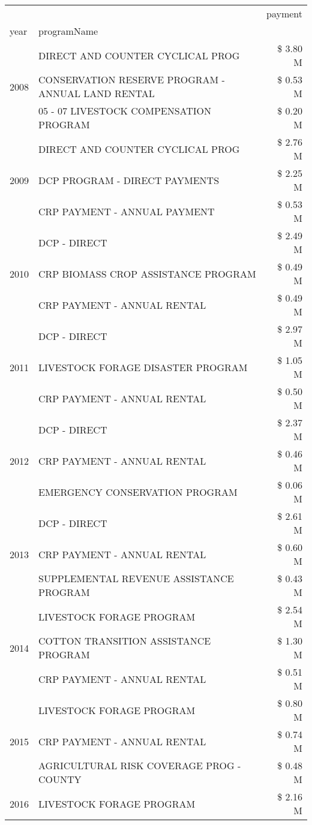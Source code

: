 \begin{tabular}{llr}
\toprule
 &  & payment \\
year & programName &  \\
\midrule
\multirow[t]{3}{*}{2008} & DIRECT AND COUNTER CYCLICAL PROG & \$ 3.80 M \\
 & CONSERVATION RESERVE PROGRAM - ANNUAL LAND RENTAL & \$ 0.53 M \\
 & 05 - 07 LIVESTOCK COMPENSATION PROGRAM & \$ 0.20 M \\
\cline{1-3}
\multirow[t]{3}{*}{2009} & DIRECT AND COUNTER CYCLICAL PROG & \$ 2.76 M \\
 & DCP PROGRAM - DIRECT PAYMENTS & \$ 2.25 M \\
 & CRP PAYMENT - ANNUAL PAYMENT & \$ 0.53 M \\
\cline{1-3}
\multirow[t]{3}{*}{2010} & DCP - DIRECT & \$ 2.49 M \\
 & CRP BIOMASS CROP ASSISTANCE PROGRAM & \$ 0.49 M \\
 & CRP PAYMENT - ANNUAL RENTAL & \$ 0.49 M \\
\cline{1-3}
\multirow[t]{3}{*}{2011} & DCP - DIRECT & \$ 2.97 M \\
 & LIVESTOCK FORAGE DISASTER PROGRAM & \$ 1.05 M \\
 & CRP PAYMENT - ANNUAL RENTAL & \$ 0.50 M \\
\cline{1-3}
\multirow[t]{3}{*}{2012} & DCP - DIRECT & \$ 2.37 M \\
 & CRP PAYMENT - ANNUAL RENTAL & \$ 0.46 M \\
 & EMERGENCY CONSERVATION PROGRAM & \$ 0.06 M \\
\cline{1-3}
\multirow[t]{3}{*}{2013} & DCP - DIRECT & \$ 2.61 M \\
 & CRP PAYMENT - ANNUAL RENTAL & \$ 0.60 M \\
 & SUPPLEMENTAL REVENUE ASSISTANCE PROGRAM & \$ 0.43 M \\
\cline{1-3}
\multirow[t]{3}{*}{2014} & LIVESTOCK FORAGE PROGRAM & \$ 2.54 M \\
 & COTTON TRANSITION ASSISTANCE PROGRAM & \$ 1.30 M \\
 & CRP PAYMENT - ANNUAL RENTAL & \$ 0.51 M \\
\cline{1-3}
\multirow[t]{3}{*}{2015} & LIVESTOCK FORAGE PROGRAM & \$ 0.80 M \\
 & CRP PAYMENT - ANNUAL RENTAL & \$ 0.74 M \\
 & AGRICULTURAL RISK COVERAGE PROG - COUNTY & \$ 0.48 M \\
\cline{1-3}
\multirow[t]{3}{*}{2016} & LIVESTOCK FORAGE PROGRAM & \$ 2.16 M \\

\end{tabular}

